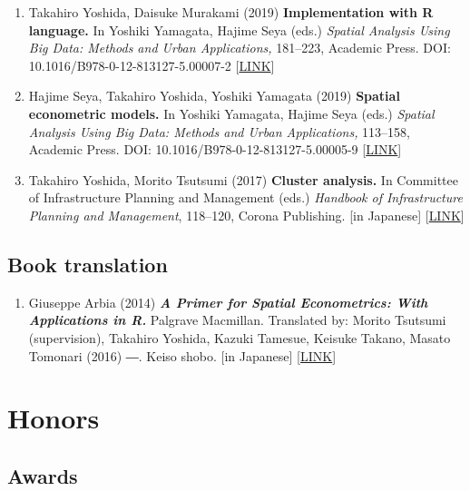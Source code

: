 \documentclass[
]{book}
\providecommand{\tightlist}{%
  \setlength{\itemsep}{0pt}\setlength{\parskip}{0pt}}
\begin{document}
\begin{enumerate}
\item
  Takahiro Yoshida, Daisuke Murakami (2019)
  \textbf{Implementation with R language.}
  In Yoshiki Yamagata, Hajime Seya (eds.)
  \emph{Spatial Analysis Using Big Data: Methods and Urban Applications,} 181--223, Academic Press.
  DOI: 10.1016/B978-0-12-813127-5.00007-2 {[}\href{https://www.elsevier.com/books/spatial-analysis-using-big-data/yamagata/978-0-12-813127-5}{LINK}{]}
\item
  Hajime Seya, Takahiro Yoshida, Yoshiki Yamagata (2019)
  \textbf{Spatial econometric models.}
  In Yoshiki Yamagata, Hajime Seya (eds.)
  \emph{Spatial Analysis Using Big Data: Methods and Urban Applications,} 113--158, Academic Press.
  DOI: 10.1016/B978-0-12-813127-5.00005-9 {[}\href{https://www.elsevier.com/books/spatial-analysis-using-big-data/yamagata/978-0-12-813127-5}{LINK}{]}
\item
  Takahiro Yoshida, Morito Tsutsumi (2017)
  \textbf{Cluster analysis.}
  In Committee of Infrastructure Planning and Management (eds.)
  \emph{Handbook of Infrastructure Planning and Management}, 118--120, Corona Publishing.
  {[}in Japanese{]} {[}\href{http://www.coronasha.co.jp/doboku-hb.html}{LINK}{]}
\end{enumerate}

\hypertarget{book-translation}{%
\section*{Book translation}\label{book-translation}}

\begin{enumerate}
\def\labelenumi{\arabic{enumi}.}
\tightlist
\item
  Giuseppe Arbia (2014)
  \textbf{\emph{A Primer for Spatial Econometrics: With Applications in R.}} Palgrave Macmillan.
  Translated by: Morito Tsutsumi (supervision), Takahiro Yoshida, Kazuki Tamesue, Keisuke Takano, Masato Tomonari (2016) ―. Keiso shobo.
  {[}in Japanese{]} {[}\href{http://www.keisoshobo.co.jp/book/b222571.html}{LINK}{]}
\end{enumerate}

\hypertarget{honors}{%
\chapter*{Honors}\label{honors}}

\hypertarget{awards}{%
\section*{Awards}\label{awards}}
\end{document}
